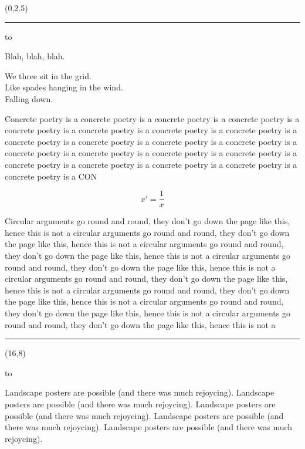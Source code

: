 \documentclass[a0]{a0poster}
\def\Head#1{\noindent\hbox to \hsize{\hfil{\LARGE\color{DarkBlue} #1}}\bigskip}
\begin{document}
\begin{textblock}{7}(0,2.5)
\hrule\medskip

\Head{Summary}

\slshape

 Blah, blah, blah.

  We three sit in the grid.\\
  Like spades hanging in the wind.\\
  Falling down.

  Concrete poetry is a concrete poetry is a concrete poetry is a 
  concrete poetry is a concrete poetry is a concrete poetry is a 
  concrete poetry is a concrete poetry is a concrete poetry is a 
  concrete poetry is a concrete poetry is a concrete poetry is a 
  concrete poetry is a concrete poetry is a concrete poetry is a 
  concrete poetry is a concrete poetry is a concrete poetry is a 
  concrete poetry is a concrete poetry is a concrete poetry is a 
  CON

  \[
  x' = \frac{1}{x}
  \]

  Circular arguments go round and round, they don't go down the page
  like this, hence this is not a circular arguments go round and round, they don't go down the page
  like this, hence this is not a circular arguments go round and round, they don't go down the page
  like this, hence this is not a circular arguments go round and round, they don't go down the page
  like this, hence this is not a circular arguments go round and round, they don't go down the page
  like this, hence this is not a circular arguments go round and round, they don't go down the page
  like this, hence this is not a circular arguments go round and round, they don't go down the page
  like this, hence this is not a circular arguments go round and round, they don't go down the page
  like this, hence this is not a 

\bigskip
\hrule
\end{textblock}

\begin{textblock}{7}(16,8)

\Head{Conclusions}

Landscape posters are possible (and there was much rejoycing).
Landscape posters are possible (and there was much rejoycing).
Landscape posters are possible (and there was much rejoycing).
Landscape posters are possible (and there was much rejoycing).
Landscape posters are possible (and there was much rejoycing).
  
\end{textblock}
\end{document}
